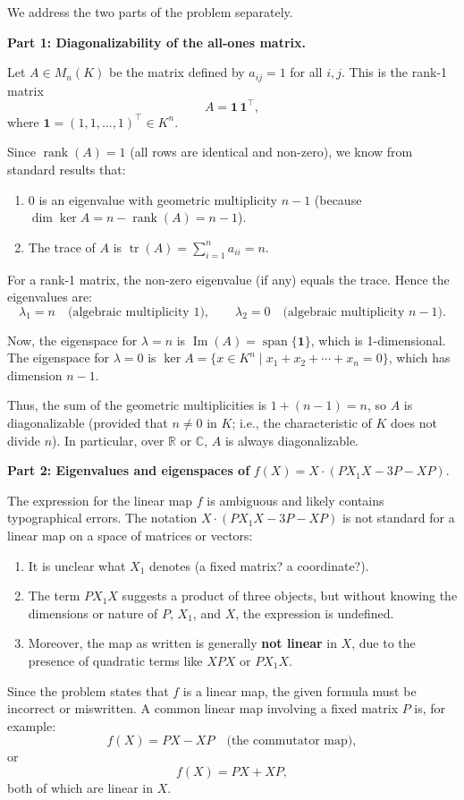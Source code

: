 \documentclass[12pt]{article}
\begin{document}
\begin{correctionbox}
We address the two parts of the problem separately.

\medskip

\noindent\textbf{Part 1: Diagonalizability of the all-ones matrix.}

Let $ A \in M_n(K) $ be the matrix defined by $ a_{ij} = 1 $ for all $ i,j $. This is the rank-1 matrix
\[
A = \mathbf{1}\,\mathbf{1}^\top,
\]
where $ \mathbf{1} = (1,1,\dots,1)^\top \in K^n $.

Since $ \operatorname{rank}(A) = 1 $ (all rows are identical and non-zero), we know from standard results that:
\begin{enumerate}
    \item $ 0 $ is an eigenvalue with geometric multiplicity $ n - 1 $ (because $ \dim \ker A = n - \operatorname{rank}(A) = n - 1 $).
    \item The trace of $ A $ is $ \operatorname{tr}(A) = \sum_{i=1}^n a_{ii} = n $.
\end{enumerate}

For a rank-1 matrix, the non-zero eigenvalue (if any) equals the trace. Hence the eigenvalues are:
\[
\lambda_1 = n \quad \text{(algebraic multiplicity 1)}, \qquad \lambda_2 = 0 \quad \text{(algebraic multiplicity } n-1\text{)}.
\]

Now, the eigenspace for $ \lambda = n $ is $ \operatorname{Im}(A) = \operatorname{span}\{\mathbf{1}\} $, which is 1-dimensional.  
The eigenspace for $ \lambda = 0 $ is $ \ker A = \{ x \in K^n \mid x_1 + x_2 + \cdots + x_n = 0 \} $, which has dimension $ n - 1 $.

Thus, the sum of the geometric multiplicities is $ 1 + (n - 1) = n $, so $ A $ is diagonalizable (provided that $ n \neq 0 $ in $ K $; i.e., the characteristic of $ K $ does not divide $ n $). In particular, over $ \mathbb{R} $ or $ \mathbb{C} $, $ A $ is always diagonalizable.

\medskip

\noindent\textbf{Part 2: Eigenvalues and eigenspaces of } $ f(X) = X \cdot (P X_1 X - 3P - XP) $.

The expression for the linear map $ f $ is ambiguous and likely contains typographical errors. The notation $ X \cdot (P X_1 X - 3P - XP) $ is not standard for a linear map on a space of matrices or vectors:
\begin{enumerate}
    \item It is unclear what $ X_1 $ denotes (a fixed matrix? a coordinate?).
    \item The term $ P X_1 X $ suggests a product of three objects, but without knowing the dimensions or nature of $ P $, $ X_1 $, and $ X $, the expression is undefined.
    \item Moreover, the map as written is generally \textbf{not linear} in $ X $, due to the presence of quadratic terms like $ X P X $ or $ P X_1 X $.
\end{enumerate}
Since the problem states that $ f $ is a linear map, the given formula must be incorrect or miswritten. A common linear map involving a fixed matrix $ P $ is, for example:
\[
f(X) = PX - XP \quad \text{(the commutator map)},
\]
or
\[
f(X) = PX + XP,
\]
both of which are linear in $ X $.


\end{correctionbox}
\end{document}
